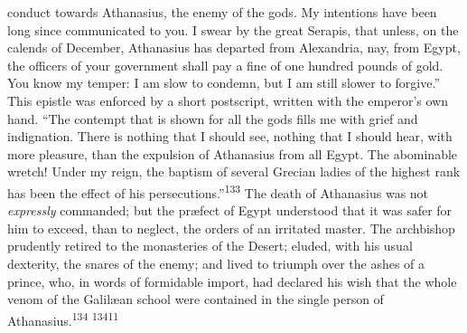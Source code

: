 conduct towards Athanasius, the enemy of the gods. My intentions
have been long since communicated to you. I swear by the great
Serapis, that unless, on the calends of December, Athanasius has
departed from Alexandria, nay, from Egypt, the officers of your
government shall pay a fine of one hundred pounds of gold. You
know my temper: I am slow to condemn, but I am still slower to
forgive.” This epistle was enforced by a short postscript,
written with the emperor’s own hand. “The contempt that is shown
for all the gods fills me with grief and indignation. There is
nothing that I should see, nothing that I should hear, with more
pleasure, than the expulsion of Athanasius from all Egypt. The
abominable wretch! Under my reign, the baptism of several Grecian
ladies of the highest rank has been the effect of his
persecutions.”\textsuperscript{133} The death of Athanasius was not \textit{expressly}
commanded; but the præfect of Egypt understood that it was safer
for him to exceed, than to neglect, the orders of an irritated
master. The archbishop prudently retired to the monasteries of
the Desert; eluded, with his usual dexterity, the snares of the
enemy; and lived to triumph over the ashes of a prince, who, in
words of formidable import, had declared his wish that the whole
venom of the Galilæan school were contained in the single person
of Athanasius.\textsuperscript{134} \textsuperscript{13411}





